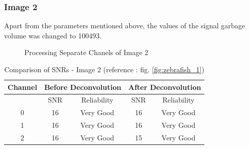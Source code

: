 \documentclass{article}
\begin{document}
\subsubsection*{Image 2}
Apart from the parameters mentioned above, the values of the signal garbage volume was changed to 100493. 
\begin{figure}[h!]
\centering
{}
\vspace{5 mm}
\caption{Processing Separate Chanels of Image 2}
\label{fig:tuning-image2}
\end{figure}
\begin{table}[h!]
\centering
\caption{Comparison of SNRs - Image 2 (reference : fig. \ref{fig:zebrafish_1})}
\begin{tabular}{*5c}
\toprule
Channel &  \multicolumn{2}{c}{Before Deconvolution} & \multicolumn{2}{c}{After Deconvolution}\\
\midrule
{}   & SNR   & Reliability    & SNR   & Reliability \\
0   &  16 & Very Good & 16 & Very Good \\
1   &  16 & Very Good & 16 & Very Good \\
2   &  16 & Very Good & 15 & Very Good \\
\bottomrule
\end{tabular}
\end{table}
\end{document}
